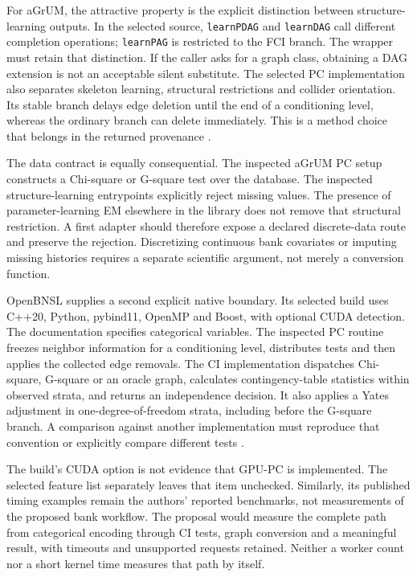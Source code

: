 For aGrUM, the attractive property is the explicit distinction between
structure-learning outputs. In the selected source, \texttt{learnPDAG} and
\texttt{learnDAG} call different completion operations; \texttt{learnPAG} is
restricted to the FCI branch. The wrapper must retain that distinction. If
the caller asks for a graph class, obtaining a DAG extension is not an
acceptable silent substitute. The selected PC implementation also separates
skeleton learning, structural restrictions and collider orientation. Its
stable branch delays edge deletion until the end of a conditioning level,
whereas the ordinary branch can delete immediately. This is a method choice
that belongs in the returned provenance \citep{exec13_cxx_agrum}.

The data contract is equally consequential. The inspected aGrUM PC setup
constructs a Chi-square or G-square test over the database. The inspected
structure-learning entrypoints explicitly reject missing values. The
presence of parameter-learning EM elsewhere in the library does not remove
that structural restriction. A first adapter should therefore expose a
declared discrete-data route and preserve the rejection. Discretizing
continuous bank covariates or imputing missing histories requires a separate
scientific argument, not merely a conversion function.

OpenBNSL supplies a second explicit native boundary. Its selected build uses
C++20, Python, pybind11, OpenMP and Boost, with optional CUDA detection. The
documentation specifies categorical variables. The inspected PC routine
freezes neighbor information for a conditioning level, distributes tests and
then applies the collected edge removals. The CI implementation dispatches
Chi-square, G-square or an oracle graph, calculates contingency-table
statistics within observed strata, and returns an independence decision. It
also applies a Yates adjustment in one-degree-of-freedom strata, including
before the G-square branch. A comparison against another implementation
must reproduce that convention or explicitly compare different tests
\citep{exec13_cxx_openbnsl}.

The build's CUDA option is not evidence that GPU-PC is implemented. The
selected feature list separately leaves that item unchecked. Similarly, its
published timing examples remain the authors' reported benchmarks, not
measurements of the proposed bank workflow. The proposal would measure the
complete path from categorical encoding through CI tests, graph conversion
and a meaningful result, with timeouts and unsupported requests retained.
Neither a worker count nor a short kernel time measures that path by itself.

